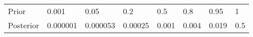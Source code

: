\begin{table}[ht]
\centering
\begin{tabular}{llllllll}
  \hline
  \hline
Prior & 0.001 & 0.05 & 0.2 & 0.5 & 0.8 & 0.95 &   1 \\ 
  Posterior & 0.000001 & 0.000053 & 0.00025 & 0.001 & 0.004 & 0.019 & 0.5 \\ 
   \hline
\end{tabular}
\end{table}
